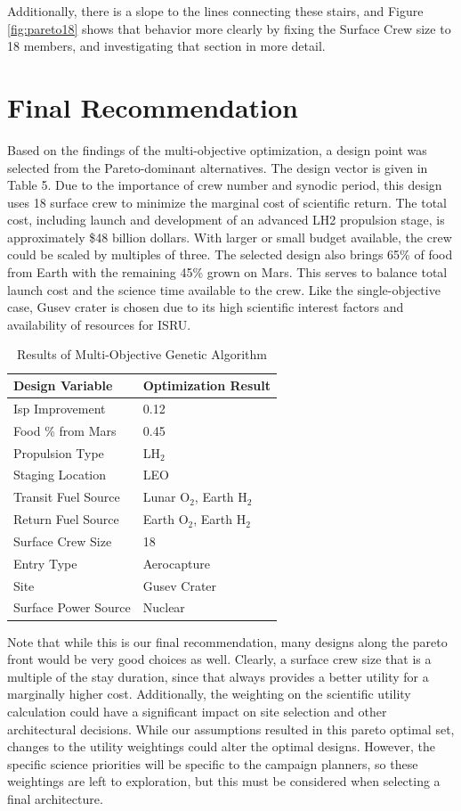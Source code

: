\documentclass[]{aiaa-pretty}
\begin{document}
Additionally, there is a slope to the lines connecting these stairs, and Figure \ref{fig:pareto18} shows that behavior more clearly by fixing the Surface Crew size to 18 members, and investigating that section in more detail.

\section{Final Recommendation}

Based on the findings of the multi-objective optimization, a design point was selected from the Pareto-dominant alternatives. The design vector is given in Table 5. Due to the importance of crew number and synodic period, this design uses 18 surface crew to minimize the marginal cost of scientific return. The total cost, including launch and development of an advanced LH2 propulsion stage, is approximately \$48 billion dollars. With larger or small budget available, the crew could be scaled by multiples of three. The selected design also brings 65\% of food from Earth with the remaining 45\% grown on Mars. This serves to balance total launch cost and the science time available to the crew. Like the single-objective case, Gusev crater is chosen due to its high scientific interest factors and availability of resources for ISRU. 

\begin{table}[h!]
	\centering
	\caption{Results of Multi-Objective Genetic Algorithm}
	\label{tab:GAmulti}
	\begin{tabular}{ll}
	\textbf{Design Variable} & \textbf{Optimization Result}\\ \hline
	Isp Improvement & 0.12 \\
	Food \% from Mars & 0.45 \\
	Propulsion Type & LH$_2$ \\
	Staging Location & LEO \\
	Transit Fuel Source & Lunar O$_2$, Earth H$_2$ \\
	Return Fuel Source & Earth O$_2$, Earth H$_2$ \\
	Surface Crew Size & 18\\
	Entry Type & Aerocapture \\
	Site & Gusev Crater \\
	Surface Power Source & Nuclear\\
	\end{tabular}
\end{table}

Note that while this is our final recommendation, many designs along the pareto front would be very good choices as well.  Clearly, a surface crew size that is a multiple of the stay duration, since that always provides a better utility for a marginally higher cost.  Additionally, the weighting on the scientific utility calculation could have a significant impact on site selection and other architectural decisions.  While our assumptions resulted in this pareto optimal set, changes to the utility weightings could alter the optimal designs. However, the specific science priorities will be specific to the campaign planners, so these weightings are left to exploration, but this must be considered when selecting a final architecture.  
\end{document}
